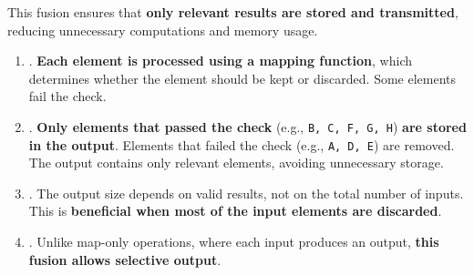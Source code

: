 \highspace
This fusion ensures that \textbf{only relevant results are stored and transmitted}, reducing unnecessary computations and memory usage.
\begin{enumerate}
    \item {}. \textbf{Each element is processed using a mapping function}, which determines whether the element should be kept or discarded. Some elements fail the check.
    \item {}. \textbf{Only elements that passed the check} (e.g., \texttt{B, C, F, G, H}) \textbf{are stored in the output}. Elements that failed the check (e.g., \texttt{A, D, E}) are removed. The output contains only relevant elements, avoiding unnecessary storage.
    \item {}. The output size depends on valid results, not on the total number of inputs. This is \textbf{beneficial when most of the input elements are discarded}.
    \item {}. Unlike map-only operations, where each input produces an output, \textbf{this fusion allows selective output}.
\end{enumerate}
